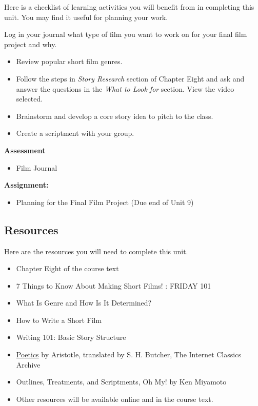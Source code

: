 \documentclass[
]{book}
\providecommand{\tightlist}{%
  \setlength{\itemsep}{0pt}\setlength{\parskip}{0pt}}
\begin{document}
\begin{reflect}
Here is a checklist of learning activities you will benefit from in completing this unit. You may find it useful for planning your work.

Log in your journal what type of film you want to work on for your final film project and why.

\begin{itemize}
\tightlist
\item
  Review popular short film genres.
\item
  Follow the steps in \emph{Story Research} section of Chapter Eight and ask and answer the questions in the \emph{What to Look for} section. View the video selected.
\item
  Brainstorm and develop a core story idea to pitch to the class.
\item
  Create a scriptment with your group.
\end{itemize}

\textbf{Assessment}

\begin{itemize}
\tightlist
\item
  Film Journal
\end{itemize}

\textbf{Assignment:}

\begin{itemize}
\tightlist
\item
  Planning for the Final Film Project (Due end of Unit 9)
\end{itemize}
\end{reflect}

\hypertarget{resources-7}{%
\subsection*{Resources}\label{resources-7}}

Here are the resources you will need to complete this unit.

\begin{itemize}
\tightlist
\item
  Chapter Eight of the course text\\
\item
  7 Things to Know About Making Short Films! : FRIDAY 101\\
\item
  What Is Genre and How Is It Determined? \\
\item
  How to Write a Short Film \\
\item
  Writing 101: Basic Story Structure \\
\item
  \ul{Poetics} by Aristotle, translated by S. H. Butcher, The Internet Classics Archive \\
\item
  Outlines, Treatments, and Scriptments, Oh My! by Ken Miyamoto \\
\item
  Other resources will be available online and in the course text.
\end{itemize}
\end{document}
